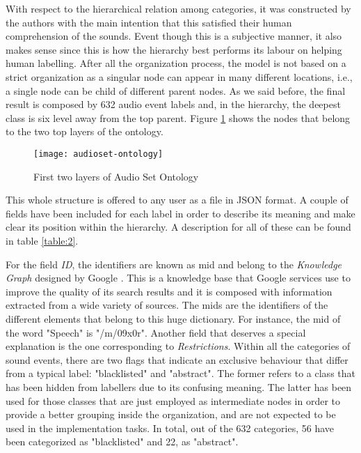 	With respect to the hierarchical relation among categories, it was constructed by the authors with the main intention that this satisfied their human comprehension of the sounds. Event though this is a subjective manner, it also makes sense since this is how the hierarchy best performs its labour on helping human labelling.
	After all the organization process, the model is not based on a strict organization as a singular node can appear in many different locations, i.e., a single node can be child of different parent nodes. As we said before, the final result is composed by 632 audio event labels and, in the hierarchy, the deepest class is six level away from the top parent. Figure \ref{fig:mesh1} shows the nodes that belong to the two top layers of the ontology.
	
	\begin{figure}[h]
		\centering
		\captionsetup{justification=centering}
		\texttt{[image: audioset-ontology]}
		\caption{First two layers of Audio Set Ontology \cite{Gemmeke2017}}
		\label{fig:mesh1}
	\end{figure}
	
	This whole structure is offered to any user as a file in JSON format. A couple of fields have been included for each label in order to describe its meaning and make clear its position within the hierarchy. A description for all of these can be found in table \ref{table:2}. 
	
	
	
	For the field \textit{ID}, the identifiers are known as \acrfull{mid} and belong to the \textit{Knowledge Graph} designed by Google \cite{Singhal2012}. This is a knowledge base that Google services use to improve the quality of its search results and it is composed with information extracted from a wide variety of sources. The \acrshort{mid}s are the identifiers of the different elements that belong to this huge dictionary. For instance, the \acrshort{mid} of the word "Speech" is "/m/09x0r". Another field that deserves a special explanation is the one corresponding to \textit{Restrictions}. Within all the categories of sound events, there are two flags that indicate an exclusive behaviour that differ from a typical label: "blacklisted" and "abstract". The former refers to a class that has been hidden from labellers due to its confusing meaning. The latter has been used for those classes that are just employed as intermediate nodes in order to provide a better grouping inside the organization, and are not expected to be used in the implementation tasks. In total, out of the 632 categories, 56 have been categorized as "blacklisted" and 22, as "abstract".


